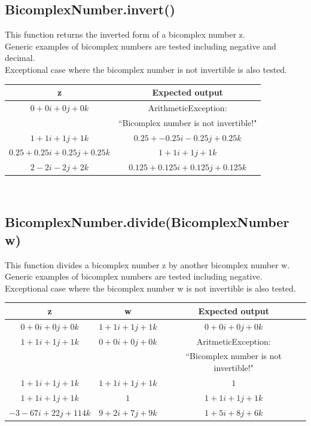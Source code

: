 \documentclass[12pt, a4]{amsart}
\begin{document}
	\subsection{BicomplexNumber.invert()}
	
		This function returns the inverted form of a bicomplex number z. \\
		Generic examples of bicomplex numbers are tested including negative and decimal.  \\
		Exceptional case where the bicomplex number is not invertible is also tested. \\
		
			\begin{tabular}{ c c }
			\hline
			z & Expected output \\
			\hline
			\hline
			$0 + 0i + 0j + 0k$ & ArithmeticException: \\ 
						& ``Bicomplex number is not invertible!"\\
			$1 + 1i + 1j + 1k$ & $0.25 + -0.25i  - 0.25j + 0.25k$ \\ 
			$0.25 + 0.25i + 0.25j + 0.25k$ & $1 + 1i + 1j + 1k$ \\ 
			$2 - 2i - 2j + 2k$ & $0.125 + 0.125i + 0.125j + 0.125k $ \\ 
			\hline
			\end{tabular} \\
	
	\subsection{BicomplexNumber.divide(BicomplexNumber w)}
	
		This function divides a bicomplex number z by another bicomplex number w. \\
		Generic examples of bicomplex numbers are tested including negative. \\
		Exceptional case where the bicomplex number w is not invertible is also tested. \\
		
			\begin{tabular}{ c c c }
			\hline
			z & w & Expected output \\
			\hline
			\hline
			$0 + 0i + 0j + 0k$ & $1 + 1i + 1j + 1k$ & $0 + 0i + 0j + 0k$ \\
			$1 + 1i + 1j + 1k$ & $0 + 0i + 0j + 0k$ & AritmeticException: \\
								& & ``Bicomplex number is not invertible!"\\ 
			$1 + 1i + 1j + 1k$ & $1 + 1i + 1j + 1k$ & $1$ \\ 
			$1 + 1i + 1j + 1k$ & $1$ & $1 + 1i + 1j + 1k$ \\ 
			$-3 -67i +22j + 114k$ & $9 + 2i + 7j + 9k$ & $1 + 5i + 8j + 6k$ \\ 
			\hline
			\end{tabular}
\end{document}
